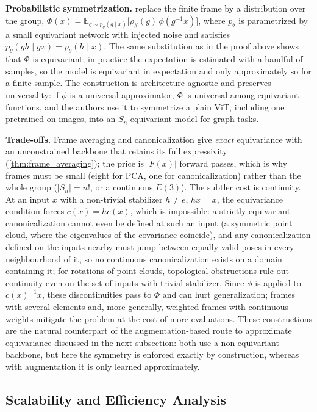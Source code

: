 \textbf{Probabilistic symmetrization.} \citet{kim2023probabilisticsymmetrization} replace the finite frame by a distribution over the group, $\Phi(x) = \mathbb{E}_{g \sim p_\theta(g \mid x)}\big[\rho_{\mathcal{Y}}(g)\, \phi(g^{-1}x)\big]$, where $p_\theta$ is parametrized by a small equivariant network with injected noise and satisfies $p_\theta(gh \mid gx) = p_\theta(h \mid x)$. The same substitution as in the proof above shows that $\Phi$ is equivariant; in practice the expectation is estimated with a handful of samples, so the model is equivariant in expectation and only approximately so for a finite sample. The construction is architecture-agnostic and preserves universality: if $\phi$ is a universal approximator, $\Phi$ is universal among equivariant functions, and the authors use it to symmetrize a plain \gls{ViT}, including one pretrained on images, into an $S_n$-equivariant model for graph tasks.

\textbf{Trade-offs.} Frame averaging and canonicalization give \emph{exact} equivariance with an unconstrained backbone that retains its full expressivity (\autoref{thm:frame_averaging}); the price is $|F(x)|$ forward passes, which is why frames must be small (eight for \gls{PCA}, one for canonicalization) rather than the whole group ($|S_n| = n!$, or a continuous $E(3)$). The subtler cost is continuity. At an input $x$ with a non-trivial stabilizer $h \neq e$, $hx = x$, the equivariance condition forces $c(x) = hc(x)$, which is impossible: a strictly equivariant canonicalization cannot even be defined at such an input (a symmetric point cloud, where the eigenvalues of the covariance coincide), and any canonicalization defined on the inputs nearby must jump between equally valid poses in every neighbourhood of it, so no continuous canonicalization exists on a domain containing it; for rotations of point clouds, topological obstructions rule out continuity even on the set of inputs with trivial stabilizer. Since $\phi$ is applied to $c(x)^{-1}x$, these discontinuities pass to $\Phi$ and can hurt generalization; frames with several elements and, more generally, weighted frames with continuous weights mitigate the problem at the cost of more evaluations. These constructions are the natural counterpart of the augmentation-based route to approximate equivariance discussed in the next subsection: both use a non-equivariant backbone, but here the symmetry is enforced exactly by construction, whereas with augmentation it is only learned approximately.

\subsection{Scalability and Efficiency Analysis}

